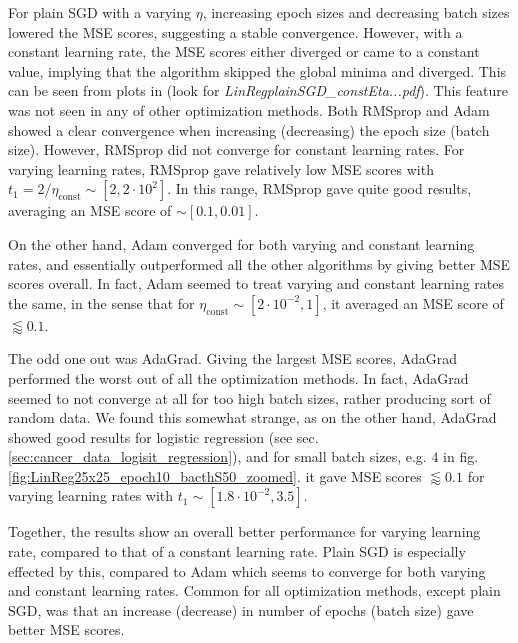 \documentclass[%
reprint,s
amsmath,amssymb,
aps,
]{revtex4-2}
\begin{document}
For plain SGD with a varying \(\eta\), increasing epoch sizes and decreasing batch sizes lowered the MSE scores, suggesting a stable convergence. However, with a constant learning rate, the MSE scores either diverged or came to a constant value, implying that the algorithm skipped the global minima and diverged. This can be seen from plots in \cite{extrafigures} (look for \emph{LinRegplainSGD\_constEta...pdf}). This feature was not seen in any of other optimization methods. Both RMSprop and Adam showed a clear convergence when increasing (decreasing) the epoch size (batch size). However, RMSprop did not converge for constant learning rates. For varying learning rates, RMSprop gave relatively low MSE scores with \(t_{1} = 2/\eta_{\text{const}}\sim [2, 2\cdot 10^{2}]\). In this range, RMSprop gave quite good results, averaging an MSE score of \(\sim [0.1, 0.01]\). 

On the other hand, Adam converged for both varying and constant learning rates, and essentially outperformed all the other algorithms by giving better MSE scores overall. In fact, Adam seemed to treat varying and constant learning rates the same, in the sense that for \(\eta_{\text{const}}\sim[2\cdot10^{-2}, 1]\), it averaged an MSE score of \(\lessapprox 0.1\).

The odd one out was AdaGrad. Giving the largest MSE scores, AdaGrad performed the worst out of all the optimization methods. In fact, AdaGrad seemed to not converge at all for too high batch sizes, rather producing sort of random data. We found this somewhat strange, as on the other hand, AdaGrad showed good results for logistic regression (see sec. \ref{sec:cancer_data_logisit_regression}), and for small batch sizes, e.g. \(4\) in fig. \ref{fig:LinReg25x25_epoch10_bacthS50_zoomed}. it gave MSE scores \(\lessapprox 0.1\) for varying learning rates with \(t_1\sim[1.8\cdot 10^{-2}, 3.5]\).

Together, the results show an overall better performance for varying learning rate, compared to that of a constant learning rate. Plain SGD is especially effected by this, compared to Adam which seems to converge for both varying and constant learning rates. Common for all optimization methods, except plain SGD, was that an increase (decrease) in number of epochs (batch size) gave better MSE scores.
\end{document}
